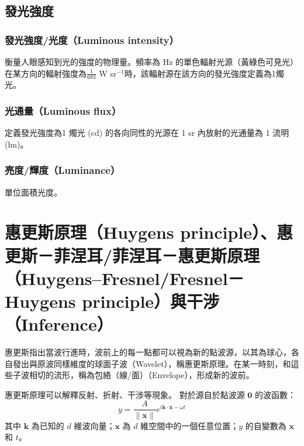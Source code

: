 \documentclass[a4paper,12pt]{report}
\begin{document}
\subsection{發光強度}
\subsubsection{發光強度/光度（Luminous intensity）}
衡量人眼感知到光的強度的物理量。頻率為 Hz 的單色輻射光源（黃綠色可見光）在某方向的輻射強度為$\frac{1}{683}$ W sr$^{-1}$時，該輻射源在該方向的發光強度定義為1燭光。
\subsubsection{光通量（Luminous flux）}
定義發光強度為1 燭光 (cd) 的各向同性的光源在 1 sr 內放射的光通量為 1 流明 (lm)。
\subsubsection{亮度/輝度（Luminance）}
單位面積光度。


\section{惠更斯原理（Huygens principle）、惠更斯－菲涅耳/菲涅耳－惠更斯原理（Huygens–Fresnel/Fresnel－Huygens principle）與干涉（Inference）}
惠更斯指出當波行進時，波前上的每一點都可以視為新的點波源，以其為球心，各自發出與原波同樣維度的球面子波（Wavelet），稱惠更斯原理。在某一時刻，和這些子波相切的流形，稱為包絡（線/面）（Envelope），形成新的波前。

惠更斯原理可以解釋反射、折射、干涉等現象。
對於源自於點波源 $\mathbf{0}$ 的波函數：
\[y=\frac{A}{\|\mathbf{x}\|}e^{i\mathbf{k}\cdot\mathbf{x}-\omega t}\]
其中 $\mathbf{k}$ 為已知的 $d$ 維波向量；$\mathbf{x}$ 為 $d$ 維空間中的一個任意位置；$y$ 的自變數為 $\mathbf{x}$ 和 $t$。
\end{document}
